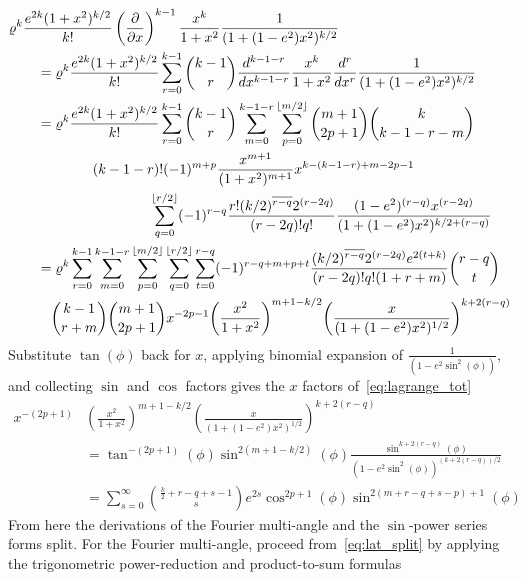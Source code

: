 \documentclass[a4paper]{amsart}
\begin{document}
\begin{align}
&\varrho^k\frac{e^{2k}(1+x^2)^{k/2}}{k!}\left(\frac{\partial}{\partial x}\right)^{k-1}\frac{x^k}{1+x^2}\frac{1}{(1+(1-e^2)x^2)^{k/2}}\nonumber\\
&\quad\quad= \varrho^k\frac{e^{2k}(1+x^2)^{k/2}}{k!}\sum^{k-1}_{r=0}\binom{k-1}{r}\frac{d^{k-1-r}}{dx^{k-1-r}}\frac{x^k}{1+x^2}\frac{d^r}{dx^r}\frac{1}{(1 + (1-e^2)x^2)^{k/2}}\nonumber\\
&\quad\quad=\varrho^k\frac{e^{2k}(1+x^2)^{k/2}}{k!}\sum^{k-1}_{r=0}\binom{k-1}{r}\sum^{k-1-r}_{m=0}\sum^{\lfloor m/2\rfloor}_{p=0}\binom{m+1}{2p+1}\binom{k}{k-1-r-m}\nonumber\\
&\quad\quad\quad\quad\quad\quad(k-1-r)!(-1)^{m+p}\frac{x^{m+1}}{(1 + x^2)^{m+1}}x^{k-(k-1-r)+m-2p-1}\nonumber\\
&\quad\quad\quad\quad\quad\quad\quad\quad\quad\quad\sum_{q=0}^{\lfloor r/2\rfloor}(-1)^{r-q}\frac{r!(k/2)^{\overline{r-q}}2^{(r-2q)}}{(r-2q)!q!}\frac{(1-e^2)^{(r-q)}x^{(r-2q)}}{(1+(1-e^2)x^2)^{k/2+(r-q)}}\nonumber\\
&\quad\quad=\varrho^k\sum^{k-1}_{r=0}\sum^{k-1-r}_{m=0}\sum^{\lfloor m/2\rfloor}_{p=0}\sum_{q=0}^{\lfloor r/2\rfloor}\sum_{t=0}^{r-q}(-1)^{r-q+m+p+t}\frac{(k/2)^{\overline{r-q}}2^{(r-2q)}e^{2(t+k)}}{(r-2q)!q!(1+r+m)}\binom{r-q}{t}\raisetag{-8.75mm}\label{eq:lagrange_tot}\\
&\quad\quad\quad\binom{k-1}{r+m}\binom{m+1}{2p+1}x^{-2p-1}\!\left(\frac{x^2}{1 + x^2}\right)^{m+1-k/2}\!\left(\frac{x}{(1+(1-e^2)x^2)^{1/2}}\right)^{k+2(r-q)}\nonumber
\end{align}
Substitute $\tan(\phi)$ back for $x$, applying binomial expansion of $\frac{1}{(1-e^2\sin^2(\phi))}$, and collecting $\sin$ and $\cos$ factors gives the $x$ factors of~\eqref{eq:lagrange_tot}
\begin{align}
\nonumber
x^{-(2p+1)}&\left(\frac{x^2}{1 + x^2}\right)^{m+1-k/2}\left(\frac{x}{(1+(1-e^2)x^2)^{1/2}}\right)^{k+2(r-q)}\\
\nonumber
&=\tan^{-(2p+1)}(\phi)\sin^{2(m+1-k/2)}(\phi)\frac{\sin^{k+2(r-q)}(\phi)}{(1-e^2\sin^2(\phi))^{(k+2(r-q))/2}}\\
\label{eq:lat_split}
&=\sum_{s=0}^\infty\binom{\frac{k}{2}+r-q+s-1}{s}e^{2s}\cos^{2p+1}(\phi)\sin^{2(m+r-q+s-p)+1}(\phi)
\end{align}
From here the derivations of the Fourier multi-angle and the $\sin$-power series forms split. For the Fourier multi-angle, proceed from~\eqref{eq:lat_split} by applying the trigonometric power-reduction and product-to-sum formulas
\end{document}
